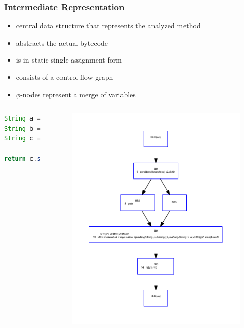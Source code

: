 \documentclass{beamer}
\begin{document}
\begin{frame}
  \frametitle{Intermediate Representation}
  
  \begin{itemize}
    \item central data structure that represents the analyzed method
    \item abstracts the actual bytecode 
    \item is in static single assignment form
    \item consists of a control-flow graph 
    \item $\phi$-nodes represent a merge of variables 
  \end{itemize}     
   
\end{frame}

\begin{frame}[fragile]
  \begin{columns}
    \begin{lstlisting}[language=Java]
String a = "test";
String b = "test2";		
String c = ((is) ? a:b);
		
return c.substring(9);
    \end{lstlisting}
    \begin{figure}
      \includegraphics[scale=0.5]{irExample.pdf}
    \end{figure}
  \end{columns}
\end{frame}
\end{document}
